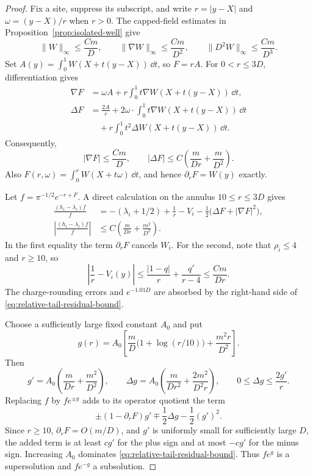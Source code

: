 \begin{proof}
Fix a site, suppress its subscript, and write $r=|y-X|$ and
$\omega=(y-X)/r$ when $r>0$.  The capped-field estimates in
Proposition~\ref{prop:isolated-well} give
\begin{equation}
 \|W\|_\infty\le \frac{Cm}{D},\qquad
 \|\nabla W\|_\infty\le \frac{Cm}{D^2},\qquad
 \|D^2W\|_\infty\le \frac{Cm}{D^3}.
 \label{eq:hopping-field-derivatives}
\end{equation}
Set $A(y)=\int_0^1W(X+t(y-X))\,\dd t$, so $F=rA$.
For $0<r\le3D$, differentiation gives
\begin{align*}
 \nabla F
  &=\omega A+r\int_0^1t\nabla W(X+t(y-X))\,\dd t,\\
 \Delta F
  &=\frac{2A}{r}
    +2\omega\cdot\int_0^1t\nabla W(X+t(y-X))\,\dd t\\
  &\quad+r\int_0^1t^2\Delta W(X+t(y-X))\,\dd t.
\end{align*}
Consequently,
\begin{equation}
 |\nabla F|\le \frac{Cm}{D},\qquad
 |\Delta F|\le C\left(\frac{m}{Dr}+\frac{m}{D^2}\right).
 \label{eq:ray-derivative-bounds}
\end{equation}
Also $F(r,\omega)=\int_0^rW(X+t\omega)\,\dd t$, and hence
$\partial_rF=W(y)$ exactly.

Let $f=\pi^{-1/2}e^{-r+F}$.  A direct calculation on the annulus
$10\le r\le3D$ gives
\begin{align}
 \frac{(h_i-\lambda_i)f}{f}
  &=-(\lambda_i+1/2)+\frac1r-V_i
       -\frac12\bigl(\Delta F+|\nabla F|^2\bigr),
       \label{eq:relative-tail-residual}\\
 \left|\frac{(h_i-\lambda_i)f}{f}\right|
  &\le C\left(\frac{m}{Dr}+\frac{m^2}{D^2}\right).
       \label{eq:relative-tail-residual-bound}
\end{align}
In the first equality the term $\partial_rF$ cancels $W_i$.
For the second, note that $\rho_i\le4$ and $r\ge10$, so
\[
 \left|\frac1r-V_i(y)\right|
 \le \frac{|1-q|}{r}+\frac{q'}{r-4}
 \le \frac{Cm}{Dr}.
\]
The charge-rounding errors and $e^{-1.01D}$ are absorbed by the
right-hand side of \eqref{eq:relative-tail-residual-bound}.

Choose a sufficiently large fixed constant $A_0$ and put
\begin{equation}
 g(r)=A_0\left[
     \frac{m}{D}\bigl(1+\log(r/10)\bigr)
     +\frac{m^2r}{D^2}\right].
 \label{eq:tail-barrier-correction}
\end{equation}
Then
\[
 g'=A_0\left(\frac{m}{Dr}+\frac{m^2}{D^2}\right),\qquad
 \Delta g=A_0\left(\frac{m}{Dr^2}+\frac{2m^2}{D^2r}\right),
 \qquad 0\le\Delta g\le\frac{2g'}r.
\]
Replacing $f$ by $fe^{\pm g}$ adds to its operator quotient the term
\begin{equation}
 \pm(1-\partial_rF)g'
       \mp\frac12\Delta g-\frac12(g')^2.
 \label{eq:barrier-signs}
\end{equation}
Since $r\ge10$, $\partial_rF=O(m/D)$, and $g'$ is uniformly small
for sufficiently large $D$, the added term is at least $c g'$ for
the plus sign and at most $-c g'$ for the minus sign.  Increasing
$A_0$ dominates \eqref{eq:relative-tail-residual-bound}.  Thus
$fe^g$ is a supersolution and $fe^{-g}$ a subsolution.


\end{proof}
